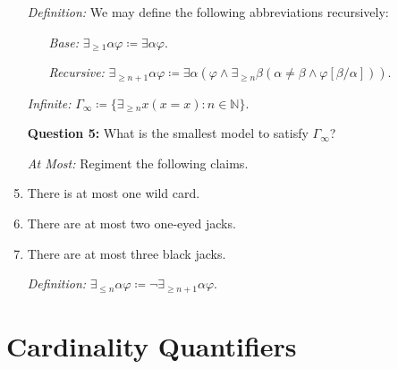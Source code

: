 \documentclass[a4paper, 11pt]{article} %
\newcommand{\set}[1]{\lbrace#1\rbrace} %
\newcommand{\qt}[2]{#1 #2} %
\newcommand{\unisub}[2]{[#1/#2]}
\begin{document}
\begin{enumerate}
  \item[\it Definition:] We may define the following abbreviations recursively:
    \begin{itemize}
      \item[\it Base:] $\qt{\exists_{\geq 1}}{\alpha}\varphi \coloneq \qt{\exists}{\alpha}\varphi$.
      \item[\it Recursive:] $\qt{\exists_{\geq n+1}}{\alpha}\varphi \coloneq \qt{\exists}{\alpha}(\varphi \wedge \qt{\exists_{\geq n}}{\beta}(\alpha \neq \beta \wedge \varphi\unisub{\beta}{\alpha})).$
    \end{itemize}
  \item[\it Infinite:] $\Gamma_{\infty} \coloneq \set{\qt{\exists_{\geq n}}{x}(x=x): n\in\mathbb{N}}$.
  \item[\bf Question 5:] What is the smallest model to satisfy $\Gamma_\infty$?
  \item[\it At Most:] Regiment the following claims.
  \item There is at most one wild card.
  \item There are at most two one-eyed jacks.
  \item There are at most three black jacks.
  \item[\it Definition:] $\qt{\exists_{\leq n}}{\alpha}\varphi \coloneq \neg\qt{\exists_{\geq n+1}}{\alpha}\varphi$.
\end{enumerate}
 
 





\section*{Cardinality Quantifiers}
 
\end{document}
